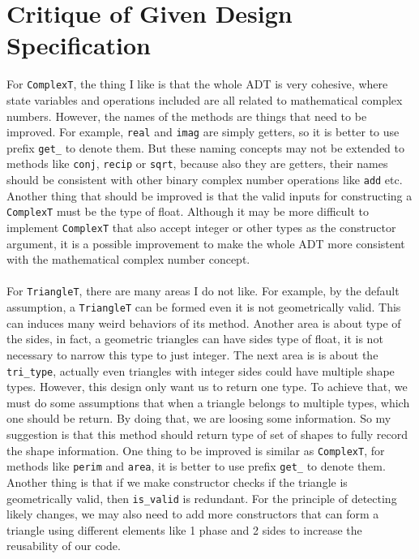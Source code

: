 \documentclass[12pt]{article}
\begin{document}
\section{Critique of Given Design Specification}
For \verb|ComplexT|, the thing I like is that the whole ADT is very cohesive, where state variables and operations included are all related to mathematical complex numbers. However, the names of the methods are things that need to be improved. For example, \verb|real| and \verb|imag| are simply getters, so it is better to use prefix \verb|get_| to denote them. But these naming concepts may not be extended to methods like \verb|conj|,  \verb|recip| or \verb|sqrt|, because also they are getters, their names should be consistent with other binary complex number operations like \verb|add| etc. Another thing that should be improved is that the valid inputs for constructing a \verb|ComplexT| must be the type of float. Although it may be more difficult to implement \verb|ComplexT| that also accept integer or other types as the constructor argument, it is a possible improvement to make the whole ADT more consistent with the mathematical complex number concept.\\\\
For \verb|TriangleT|, there are many areas I do not like. For example, by the default assumption, a \verb|TriangleT| can be formed even it is not geometrically valid. This can induces many weird behaviors of its method. 
Another area is about type of the sides, in fact, a geometric triangles can have sides type of float, it is not necessary to narrow this type to just integer. The next area is is about the \verb|tri_type|, actually even triangles with integer sides could have multiple shape types. However, this design only want us to return one type. To achieve that, we must do some assumptions that when a triangle belongs to multiple types, which one should be return. By doing that, we are loosing some information. So my suggestion is that this method should return type of set of shapes to fully record the shape information.
One thing to be improved is similar as \verb|ComplexT|, for methods like \verb|perim| and \verb|area|, it is better to use prefix \verb|get_| to denote them. Another thing is that if we make constructor checks if the triangle is geometrically valid, then \verb|is_valid| is redundant. For the principle of detecting likely changes, we may also need to add more constructors that can form a triangle using different elements like 1 phase and 2 sides to increase the reusability of our code.
\end{document}
